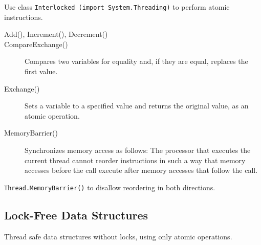 Use class \texttt{Interlocked (import System.Threading)} to perform atomic instructions. 

\begin{description}
  \item[Add(), Increment(), Decrement()]
  \item[CompareExchange()] Compares two variables for equality and, if they are equal, replaces the first value.
  \item[Exchange()] Sets a variable to a specified value and returns the original value, as an atomic operation.
  \item[MemoryBarrier()] Synchronizes memory access as follows: The processor that executes the current thread cannot reorder instructions in such a way that memory accesses before the call execute after memory accesses that follow the call.    
\end{description}

\texttt{Thread.MemoryBarrier()} to disallow reordering in both directions.

\subsection{Lock-Free Data Structures}
Thread safe data structures without locks, using only atomic operations.
